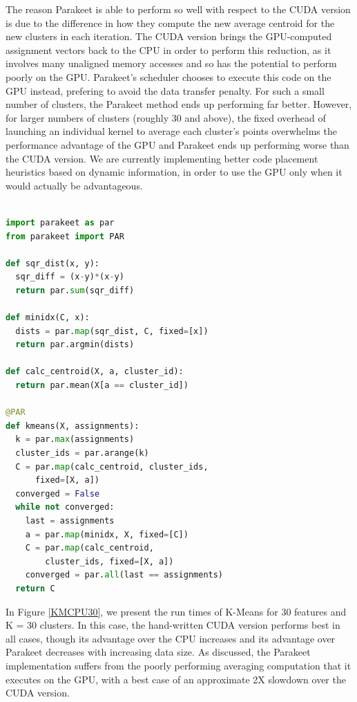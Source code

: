\documentclass[10pt,twocolumn]{article}
\begin{document}
The reason Parakeet is able to perform so well with respect to the CUDA version is due to the difference in how they compute the new average centroid for the new clusters in each iteration.  The CUDA version brings the GPU-computed assignment vectors back to the CPU in order to perform this reduction, as it involves many unaligned memory accesses and so has the potential to perform poorly on the GPU.  Parakeet's scheduler chooses to execute this code on the GPU instead, prefering to avoid the data transfer penalty.  For such a small number of clusters, the Parakeet method ends up performing far better.  However, for larger numbers of clusters (roughly 30 and above), the fixed overhead of launching an individual kernel to average each cluster's points overwhelms the performance advantage of the GPU and Parakeet ends up performing worse than the CUDA version.  We are currently implementing better code placement heuristics based on dynamic information, in order to use the GPU only when it would actually be 
advantageous.
\\
\\
\begin{lstlisting}[language=Python,frame=single, label=K-Means-Code, caption={K-Means Parakeet Code}, belowskip=0.5em]
import parakeet as par
from parakeet import PAR

def sqr_dist(x, y):
  sqr_diff = (x-y)*(x-y)
  return par.sum(sqr_diff)

def minidx(C, x):
  dists = par.map(sqr_dist, C, fixed=[x])
  return par.argmin(dists)

def calc_centroid(X, a, cluster_id):
  return par.mean(X[a == cluster_id])

@PAR
def kmeans(X, assignments):
  k = par.max(assignments)
  cluster_ids = par.arange(k)
  C = par.map(calc_centroid, cluster_ids, 
      fixed=[X, a])
  converged = False
  while not converged:
    last = assignments
    a = par.map(minidx, X, fixed=[C])
    C = par.map(calc_centroid, 
	    cluster_ids, fixed=[X, a])
    converged = par.all(last == assignments)
  return C
\end{lstlisting}

In Figure \ref{KMCPU30}, we present the run times of K-Means for 30 features and K = 30 clusters.  In this case, the hand-written CUDA version performs best in all cases, though its advantage over the CPU increases and its advantage over Parakeet decreases with increasing data size.  As discussed, the Parakeet implementation suffers from the poorly performing averaging computation that it executes on the GPU, with a best case of an approximate 2X slowdown over the CUDA version. 
\end{document}
